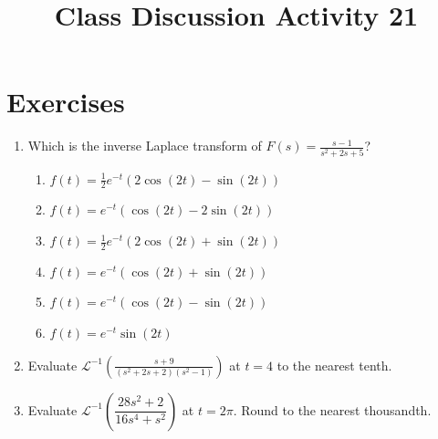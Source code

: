 \documentclass{ximera}
\begin{document}
\begin{abstract}
 \end{abstract}

    \title{Class Discussion Activity 21}
    
    \maketitle

\section*{Exercises}

\begin{enumerate}[label=(\arabic*)]


\item Which is the inverse Laplace transform of $\displaystyle F(s)=\frac{s-1}{s^2+2s+5}$?

\begin{enumerate}[label=(\alph*)]
\item $f(t)=\frac{1}{2}e^{-t}\left(2\cos{(2t)}-\sin{(2t)}\right)$
\item $f(t)=e^{-t}\left(\cos{(2t)}-2\sin{(2t)}\right)$
\item $f(t)=\frac{1}{2}e^{-t}\left(2\cos{(2t)}+\sin{(2t)}\right)$
\item $f(t)=e^{-t}\left(\cos{(2t)}+\sin{(2t)}\right)$ 
\item $f(t)=e^{-t}\left(\cos{(2t)}-\sin{(2t)}\right)$  %
\item $f(t)=e^{-t}\sin{(2t)}$
\end{enumerate}



\item Evaluate $\displaystyle \mathcal{L}^{-1}\left(\frac{s+9}{(s^2+2s+2)(s^2-1)}\right)$ at $t=4$ to the nearest tenth.





\item Evaluate $\displaystyle \mathcal{L}^{-1}\left(\dfrac{28s^2+2}{16s^4+s^2}\right)$ at $t=2\pi$.  Round to the nearest thousandth.



\end{enumerate}
\end{document}
